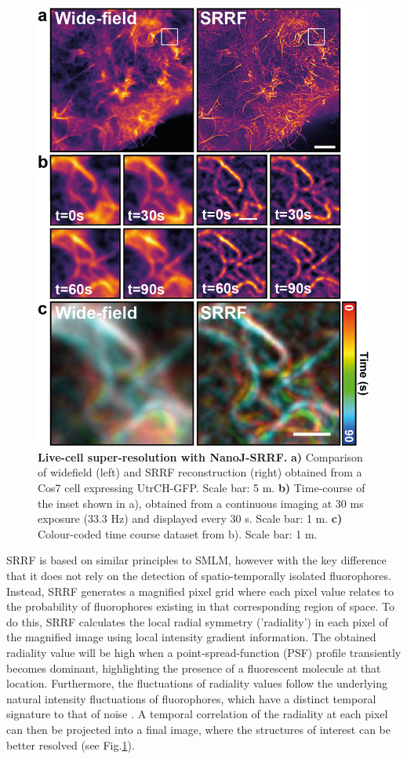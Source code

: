  \begin{figure}[!b]
    \centering
    \includegraphics{Figures/FigureSRRF_v4.png}
    \caption{\textbf{Live-cell super-resolution with NanoJ-SRRF.} \textbf{a)} Comparison of widefield (left) and SRRF reconstruction (right) obtained from a Cos7 cell expressing UtrCH-GFP. Scale bar: 5 \micro m. \textbf{b)} Time-course of the inset shown in a), obtained from  a continuous imaging at 30 ms exposure (33.3 Hz) and displayed every 30 s. Scale bar: 1 \micro m. \textbf{c)} Colour-coded time course dataset from b). Scale bar: 1 \micro m.}
    \label{fig:SRRF}
 \end{figure}
 
 SRRF is based on similar principles to SMLM, however with the key difference that it does not rely on the detection of spatio-temporally isolated fluorophores. Instead, SRRF generates a magnified pixel grid where each pixel value relates to the probability of fluorophores existing in that corresponding region of space. To do this, SRRF calculates the local radial symmetry ('radiality') in each pixel of the magnified image using local intensity gradient information. The obtained radiality value will be high when a point-spread-function (PSF) profile transiently becomes dominant, highlighting the presence of a fluorescent molecule at that location. Furthermore, the fluctuations of radiality values follow the underlying natural intensity fluctuations of fluorophores, which have a distinct temporal signature to that of noise \cite{dertinger2009fast}. A temporal correlation of the radiality at each pixel can then be projected into a final image, where the structures of interest can be better resolved (see Fig.\ref{fig:SRRF}).

